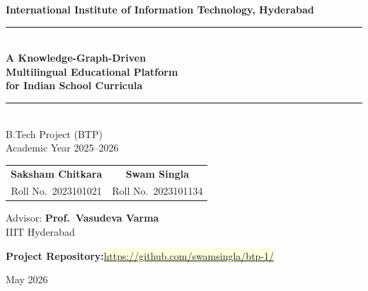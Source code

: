 \documentclass[12pt,a4paper]{article}
\begin{document}
\thispagestyle{empty}

\begin{center}
\vspace*{1.2cm}
{\large\bfseries International Institute of Information Technology, Hyderabad}\\[1.4cm]

{\color{mainblue}\rule{\linewidth}{1.8pt}}\\[0.8cm]

{\LARGE\bfseries A Knowledge-Graph-Driven\\[0.45cm]
Multilingual Educational Platform\\[0.45cm]
for Indian School Curricula}\\[0.8cm]

{\color{mainblue}\rule{\linewidth}{1.8pt}}\\[2.2cm]

{\large B.Tech Project (BTP)}\\[0.35cm]
{\large Academic Year 2025--2026}\\[2.6cm]

\renewcommand{\arraystretch}{1.9}
\begin{tabular}{c@{\qquad\qquad\quad}c}
  \textbf{\large Saksham Chitkara} & \textbf{\large Swam Singla} \\
  {\normalsize Roll No.\ 2023101021} & {\normalsize Roll No.\ 2023101134}
\end{tabular}

\vspace{1.2cm}
{\normalsize Advisor: \textbf{Prof.\ Vasudeva Varma}}\\[0.3cm]
{\normalsize IIIT Hyderabad}

{\normalsize \textbf{Project Repository:}\enspace\setlength{\fboxsep}{3pt}\colorbox{lightyellow}{\url{https://github.com/swamsingla/btp-1/}}}

\vfill
{\large May 2026}
\end{center}

\newpage
\thispagestyle{plain}
\end{document}
